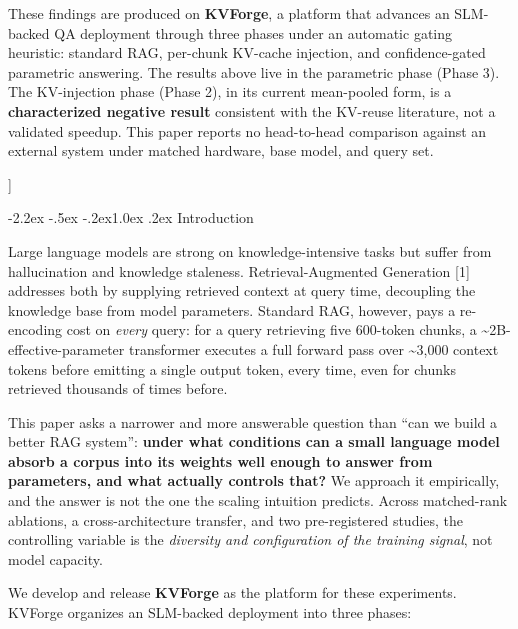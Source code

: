 \documentclass[10pt,twocolumn]{article}
\makeatletter
\renewcommand\section{\@startsection{section}{1}{\z@}%
  {-2.2ex \@plus -.5ex \@minus -.2ex}{1.0ex \@plus .2ex}%
  {\normalfont\large\bfseries}}
\makeatother
\begin{document}
{\begin{minipage}{\textwidth}
{These findings are produced on \textbf{KVForge}, a platform that advances an SLM-backed QA deployment through three phases under an automatic gating heuristic: standard RAG, per-chunk KV-cache injection, and confidence-gated parametric answering. The results above live in the parametric phase (Phase 3). The KV-injection phase (Phase 2), in its current mean-pooled form, is a \textbf{characterized negative result} consistent with the KV-reuse literature, not a validated speedup. This paper reports no head-to-head comparison against an external system under matched hardware, base model, and query set.\par}
\end{minipage}
\vspace{1.3em}
}]

\hypertarget{introduction}{%
\section{Introduction}\label{introduction}}

Large language models are strong on knowledge-intensive tasks but suffer from hallucination and knowledge staleness. Retrieval-Augmented Generation {[}1{]} addresses both by supplying retrieved context at query time, decoupling the knowledge base from model parameters. Standard RAG, however, pays a re-encoding cost on \emph{every} query: for a query retrieving five 600-token chunks, a \textasciitilde2B-effective-parameter transformer executes a full forward pass over \textasciitilde3,000 context tokens before emitting a single output token, every time, even for chunks retrieved thousands of times before.

This paper asks a narrower and more answerable question than ``can we build a better RAG system'': \textbf{under what conditions can a small language model absorb a corpus into its weights well enough to answer from parameters, and what actually controls that?} We approach it empirically, and the answer is not the one the scaling intuition predicts. Across matched-rank ablations, a cross-architecture transfer, and two pre-registered studies, the controlling variable is the \emph{diversity and configuration of the training signal}, not model capacity.

We develop and release \textbf{KVForge} as the platform for these experiments. KVForge organizes an SLM-backed deployment into three phases:
\end{document}
